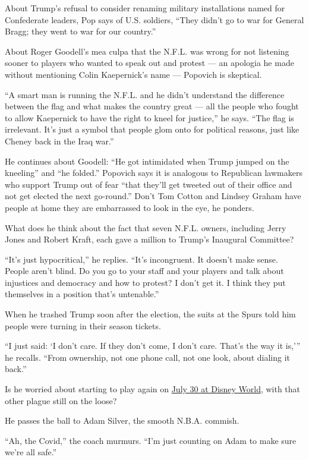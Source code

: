 About Trump's refusal to consider renaming military installations named
for Confederate leaders, Pop says of U.S. soldiers, ``They didn't go to
war for General Bragg; they went to war for our country.''

About Roger Goodell's mea culpa that the N.F.L. was wrong for not
listening sooner to players who wanted to speak out and protest --- an
apologia he made without mentioning Colin Kaepernick's name --- Popovich
is skeptical.

``A smart man is running the N.F.L. and he didn't understand the
difference between the flag and what makes the country great --- all the
people who fought to allow Kaepernick to have the right to kneel for
justice,'' he says. ``The flag is irrelevant. It's just a symbol that
people glom onto for political reasons, just like Cheney back in the
Iraq war.''

He continues about Goodell: ``He got intimidated when Trump jumped on
the kneeling'' and ``he folded.'' Popovich says it is analogous to
Republican lawmakers who support Trump out of fear ``that they'll get
tweeted out of their office and not get elected the next go-round.''
Don't Tom Cotton and Lindsey Graham have people at home they are
embarrassed to look in the eye, he ponders.

What does he think about the fact that seven N.F.L. owners, including
Jerry Jones and Robert Kraft, each gave a million to Trump's Inaugural
Committee?

``It's just hypocritical,'' he replies. ``It's incongruent. It doesn't
make sense. People aren't blind. Do you go to your staff and your
players and talk about injustices and democracy and how to protest? I
don't get it. I think they put themselves in a position that's
untenable.''

When he trashed Trump soon after the election, the suits at the Spurs
told him people were turning in their season tickets.

``I just said: `I don't care. If they don't come, I don't care. That's
the way it is,''' he recalls. ``From ownership, not one phone call, not
one look, about dialing it back.''

Is he worried about starting to play again on
\href{https://www.nytimes.com/2020/06/02/sports/basketball/disney-world-nba-sports-complex.html}{July
30 at Disney World}, with that other plague still on the loose?

He passes the ball to Adam Silver, the smooth N.B.A. commish.

``Ah, the Covid,'' the coach murmurs. ``I'm just counting on Adam to
make sure we're all safe.''

